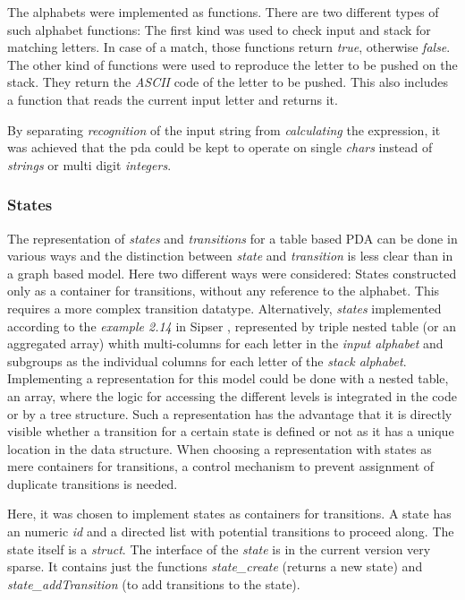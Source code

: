 \documentclass[a4paper,11pt,twoside]{article}
\begin{document}
The alphabets were implemented as functions. There are two different
types of such alphabet functions: The first kind was used to check
input and stack for matching letters. In case of a match, those
functions return \textit{true}, otherwise \textit{false}. The other
kind of functions were used to reproduce the letter to be pushed on the
stack. They return the \textit{ASCII} code of the letter to be pushed. This
also includes a function that reads the current input letter and  
returns it.

By separating \textit{recognition} of the input string from
\textit{calculating} the expression, it was achieved that the pda
could be kept to operate on single \textit{chars} instead of
\textit{strings} or multi digit \textit{integers}.  

\subsubsection{States}
The representation of \textit{states} and \textit{transitions} for
a table based PDA can be done in various ways and the distinction
between \textit{state} and \textit{transition} is less clear than in a
graph based model. Here two different ways were considered: States
constructed only as a container for transitions, without any reference
to the alphabet. This requires a more complex transition
datatype. Alternatively, \textit{states} implemented according to 
the \textit{example 2.14} in Sipser \cite[p. 114]{sipser2012}, represented by
triple nested table (or an aggregated array) whith multi-columns for
each letter in the \textit{input alphabet} and subgroups as the 
individual columns for each letter of the \textit{stack alphabet}. Implementing
a representation for this model could be done with a nested table, an
array, where the logic for accessing the different levels is
integrated in the code or by a tree structure. Such a representation has
the advantage that it is directly visible whether a transition for a
certain state is defined or not as it has a unique location in
the data structure. When choosing a representation with states as mere
containers for transitions, a control mechanism to prevent assignment
of duplicate transitions is needed. 

Here, it was chosen to implement states as containers for
transitions. A state has an numeric \textit{id} and a directed list
with potential transitions to proceed along. The state itself is a
\textit{struct}. The interface of the \textit{state} is in the current
version very sparse. It contains just the functions
\textit{state\_create} (returns a new state) and
\textit{state\_addTransition} (to add transitions to the state).  
\end{document}
